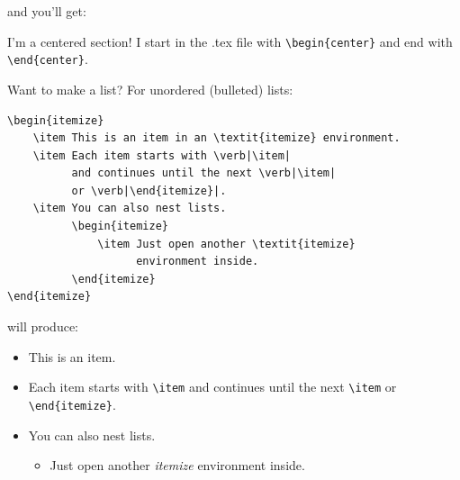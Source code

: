 \documentclass[en,inscr,ack,preface]{dimscthesis}
\begin{document}
and you'll get:

\begin{center}
    I'm a centered section!
    I start in the .tex file with \verb|\begin{center}|
    and end with \verb|\end{center}|.
\end{center}

Want to make a list?
For unordered (bulleted) lists:
\begin{verbatim}
\begin{itemize}
    \item This is an item in an \textit{itemize} environment.
    \item Each item starts with \verb|\item|
          and continues until the next \verb|\item|
          or \verb|\end{itemize}|.
    \item You can also nest lists.
          \begin{itemize}
              \item Just open another \textit{itemize}
                    environment inside.
          \end{itemize}
\end{itemize}
\end{verbatim}

will produce:
\begin{itemize}
    \item This is an item.
    \item Each item starts with \verb|\item|
    and continues until the next \verb|\item|
    or \verb|\end{itemize}|.
\item You can also nest lists.
    \begin{itemize}
        \item Just open another \textit{itemize} environment inside.
    \end{itemize}
\end{itemize}

\clearpage
\end{document}
